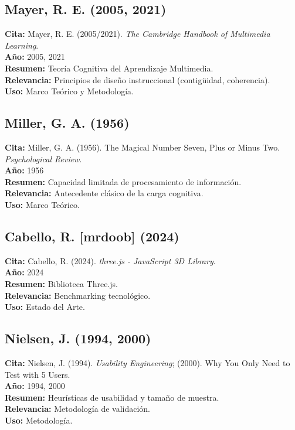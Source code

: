 \subsection*{Mayer, R. E. (2005, 2021)}
\textbf{Cita:} Mayer, R. E. (2005/2021). \textit{The Cambridge Handbook of Multimedia Learning}. \\
\textbf{Año:} 2005, 2021 \\
\textbf{Resumen:} Teoría Cognitiva del Aprendizaje Multimedia. \\
\textbf{Relevancia:} Principios de diseño instruccional (contigüidad, coherencia). \\
\textbf{Uso:} Marco Teórico y Metodología.

\subsection*{Miller, G. A. (1956)}
\textbf{Cita:} Miller, G. A. (1956). The Magical Number Seven, Plus or Minus Two. \textit{Psychological Review}. \\
\textbf{Año:} 1956 \\
\textbf{Resumen:} Capacidad limitada de procesamiento de información. \\
\textbf{Relevancia:} Antecedente clásico de la carga cognitiva. \\
\textbf{Uso:} Marco Teórico.

\subsection*{Cabello, R. [mrdoob] (2024)}
\textbf{Cita:} Cabello, R. (2024). \textit{three.js - JavaScript 3D Library}. \\
\textbf{Año:} 2024 \\
\textbf{Resumen:} Biblioteca Three.js. \\
\textbf{Relevancia:} Benchmarking tecnológico. \\
\textbf{Uso:} Estado del Arte.

\subsection*{Nielsen, J. (1994, 2000)}
\textbf{Cita:} Nielsen, J. (1994). \textit{Usability Engineering}; (2000). Why You Only Need to Test with 5 Users. \\
\textbf{Año:} 1994, 2000 \\
\textbf{Resumen:} Heurísticas de usabilidad y tamaño de muestra. \\
\textbf{Relevancia:} Metodología de validación. \\
\textbf{Uso:} Metodología.

